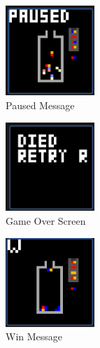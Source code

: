 \documentclass{article}
\begin{document}
\begin{figure}[ht!]
    \centering
    \includegraphics[width=0.3\textwidth]{paused_message.png}
    \caption{Paused Message}
    \label{Instructions}
\end{figure}

\begin{figure}[ht!]
    \centering
    \includegraphics[width=0.3\textwidth]{retry_screen.png}
    \caption{Game Over Screen}
    \label{Instructions}
\end{figure}

\begin{figure}[ht!]
    \centering
    \includegraphics[width=0.3\textwidth]{win_screen.png}
    \caption{Win Message}
    \label{Instructions}
\end{figure}
\end{document}
